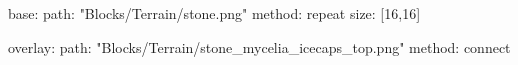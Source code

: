 base:
  path: "Blocks/Terrain/stone.png"
  method: repeat
  size: [16,16]

overlay:
  path: "Blocks/Terrain/stone_mycelia_icecaps_top.png"
  method: connect